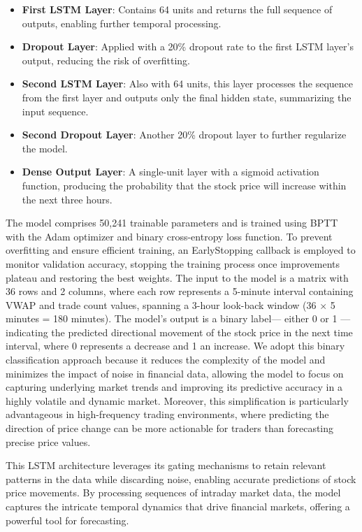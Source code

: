 \documentclass[letterpaper]{article}
\begin{document}
\begin{itemize}
    \item \textbf{First LSTM Layer}: Contains 64 units and returns the full sequence of outputs, enabling further temporal processing.
    \item \textbf{Dropout Layer}: Applied with a 20\% dropout rate to the first LSTM layer’s output, reducing the risk of overfitting.
    \item \textbf{Second LSTM Layer}: Also with 64 units, this layer processes the sequence from the first layer and outputs only the final hidden state, summarizing the input sequence.
    \item \textbf{Second Dropout Layer}: Another 20\% dropout layer to further regularize the model.
    \item \textbf{Dense Output Layer}: A single-unit layer with a sigmoid activation function, producing the probability that the stock price will increase within the next three hours.
\end{itemize}

The model comprises 50,241 trainable parameters and is trained using BPTT with the Adam optimizer and binary cross-entropy loss function. To prevent overfitting and ensure efficient training, an EarlyStopping callback is employed to monitor validation accuracy, stopping the training process once improvements plateau and restoring the best weights. The input to the model is a matrix with 36 rows and 2 columns, where each row represents a 5-minute interval containing VWAP and trade count values, spanning a 3-hour look-back window (36 \(\times\) 5 minutes = 180 minutes).  The model’s output is a binary label— either 0 or 1 —indicating the predicted directional movement of the stock price in the next time interval, where 0 represents a decrease and 1 an increase. We adopt this binary classification approach because it reduces the complexity of the model and minimizes the impact of noise in financial data, allowing the model to focus on capturing underlying market trends and improving its predictive accuracy in a highly volatile and dynamic market. Moreover, this simplification is particularly advantageous in high-frequency trading environments, where predicting the direction of price change can be more actionable for traders than forecasting precise price values.

This LSTM architecture leverages its gating mechanisms to retain relevant patterns in the data while discarding noise, enabling accurate predictions of stock price movements. By processing sequences of intraday market data, the model captures the intricate temporal dynamics that drive financial markets, offering a powerful tool for forecasting.
\end{document}
